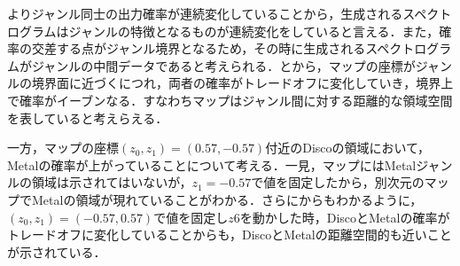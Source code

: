 よりジャンル同士の出力確率が連続変化していることから，生成されるスペクトログラムはジャンルの特徴となるものが連続変化をしていると言える．また，確率の交差する点がジャンル境界となるため，その時に生成されるスペクトログラムがジャンルの中間データであると考えられる．とから，マップの座標がジャンルの境界面に近づくにつれ，両者の確率がトレードオフに変化していき，境界上で確率がイーブンなる．すなわちマップはジャンル間に対する距離的な領域空間を表していると考えらえる．


一方，マップの座標$(z_0, z_1) = (0.57, -0.57)$付近のDiscoの領域において，Metalの確率が上がっていることについて考える．一見，マップにはMetalジャンルの領域は示されてはいないが，$z_1=-0.57$で値を固定したから，別次元のマップでMetalの領域が現れていることがわかる．さらにからもわかるように，$(z_0, z_1) = (-0.57, 0.57)$で値を固定し$z6$を動かした時，DiscoとMetalの確率がトレードオフに変化していることからも，DiscoとMetalの距離空間的も近いことが示されている．

